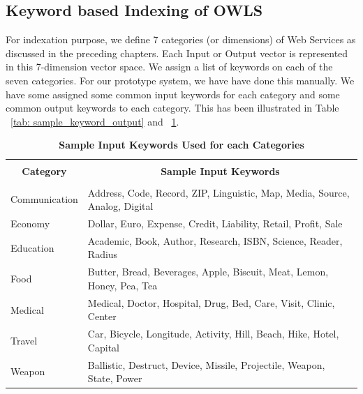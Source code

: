 \documentclass[12pt, oneside]{book}
\begin{document}
\subsection{Keyword based Indexing of OWLS}
For indexation purpose, we define 7 categories (or dimensions) of Web Services as discussed in the preceding chapters. Each Input or Output vector is represented in this 7-dimension vector space. We assign a list of keywords on each of the seven categories. For our prototype system, we have have done this manually. We have some assigned some common input keywords for each category and some common output keywords to each category. This has been illustrated in Table ~\ref{tab: sample_keyword_output} and ~\ref{tab: sample_keyword_input}.

\begin{table}[h]
	\begin{center}
		\caption{\textbf{Sample Input Keywords Used for each Categories}}
		\label{tab: sample_keyword_input}
		\begin{tabular}{| p{} | p{} |}
			\hline
			\multicolumn{1}{|c|}{} & \multicolumn{1}{c|}{} \\
			\multicolumn{1}{|c|}{\textbf{Category}} & \multicolumn{1}{c|}{\textbf{Sample Input Keywords}} \\
			\multicolumn{1}{|c|}{} & \multicolumn{1}{c|}{} \\
			\hline
			Communication & Address, Code, Record, ZIP, Linguistic, Map, Media, Source, Analog, Digital \\ \hline
			Economy &  Dollar, Euro, Expense, Credit, Liability, Retail, Profit, Sale\\ \hline
			Education & Academic, Book, Author, Research, ISBN, Science, Reader, Radius\\ \hline
			Food & Butter, Bread, Beverages, Apple, Biscuit, Meat, Lemon, Honey, Pea, Tea\\ \hline
			Medical & Medical, Doctor, Hospital, Drug, Bed, Care, Visit, Clinic, Center\\ \hline
			Travel & Car, Bicycle, Longitude, Activity, Hill, Beach, Hike, Hotel, Capital\\ \hline
			Weapon & Ballistic, Destruct, Device, Missile, Projectile, Weapon, State, Power\\ \hline
		\end{tabular}
	\end{center}
\end{table}
\end{document}
